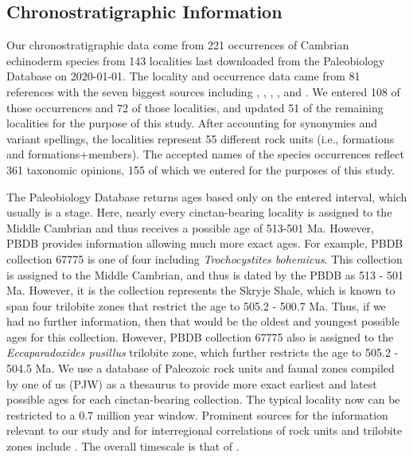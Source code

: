 \documentclass{article}
\begin{document}
\subsection{Chronostratigraphic Information}
Our chronostratigraphic data come from 221 occurrences of Cambrian echinoderm species from 143 localities last downloaded from the Paleobiology Database on 2020-01-01.  The locality and occurrence data came from 81 references with the seven biggest sources including \citet{Nardin2017}, \citet{Zamora2009}, \citet{Chlupac1998}, \citet{Sprinkle2006}, \citet{Termier1973} and \citet{Sprinkle1973}. We entered 108 of those occurrences and 72 of those localities, and updated 51 of the remaining localities for the purpose of this study.  After accounting for synonymies and variant spellings, the localities represent 55 different rock units (i.e., formations and formations+members).  The accepted names of the species occurrences reflect 361 taxonomic opinions, 155 of which we entered for the purposes of this study.

The Paleobiology Database returns ages based only on the entered interval, which usually is a stage. Here, nearly every cinctan-bearing locality is assigned to the Middle Cambrian and thus receives a possible age of 513-501 Ma. However, PBDB provides information allowing much more exact ages. For example, PBDB collection 67775 is one of four including \textit{Trochocystites bohemicus}. This collection is assigned to the Middle Cambrian, and thus is dated by the PBDB as 513 - 501 Ma. However, it is the collection represents the Skryje Shale, which is known to span four trilobite zones that restrict the age to 505.2 - 500.7 Ma. Thus, if we had no further information, then that would be the oldest and youngest possible ages for this collection. However, PBDB collection 67775 also is assigned to the \textit{Eccaparadoxides pusillus} trilobite zone, which further restricts the age to 505.2 - 504.5 Ma. We use a database of Paleozoic rock units and faunal zones compiled by one of us (PJW) as a thesaurus to provide more exact earliest and latest possible ages for each cinctan-bearing collection. The typical locality now can be restricted to a 0.7 million year window. Prominent sources for the information relevant to our study and for interregional correlations of rock units and trilobite zones include \cite{Alvaro2001, Linan2004, Geyer2006, Geyer2000, Alvaro2007, Geyer2019}.  The overall timescale is that of \cite{Gradstein2012}. 
\end{document}
